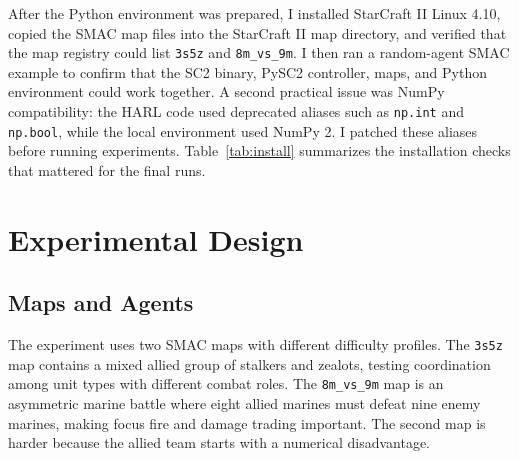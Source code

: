 \documentclass{article}
\begin{document}
After the Python environment was prepared, I installed StarCraft II Linux 4.10, copied the SMAC map files into the StarCraft II map directory, and verified that the map registry could list \texttt{3s5z} and \texttt{8m\_vs\_9m}. I then ran a random-agent SMAC example to confirm that the SC2 binary, PySC2 controller, maps, and Python environment could work together. A second practical issue was NumPy compatibility: the HARL code used deprecated aliases such as \texttt{np.int} and \texttt{np.bool}, while the local environment used NumPy 2. I patched these aliases before running experiments. Table~\ref{tab:install} summarizes the installation checks that mattered for the final runs.

\begin{table}[h]
\centering
\caption{Environment installation and validation checklist.}
\label{tab:install}
\end{table}

\section{Experimental Design}

\subsection{Maps and Agents}

The experiment uses two SMAC maps with different difficulty profiles. The \texttt{3s5z} map contains a mixed allied group of stalkers and zealots, testing coordination among unit types with different combat roles. The \texttt{8m\_vs\_9m} map is an asymmetric marine battle where eight allied marines must defeat nine enemy marines, making focus fire and damage trading important. The second map is harder because the allied team starts with a numerical disadvantage.
\end{document}
